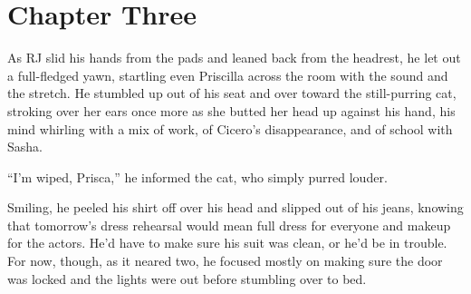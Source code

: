 \chapter{Chapter Three}

As RJ slid his hands from the pads and leaned back from the headrest, he let out a full-fledged yawn, startling even Priscilla across the room with the sound and the stretch.  He stumbled up out of his seat and over toward the still-purring cat, stroking over her ears once more as she butted her head up against his hand, his mind whirling with a mix of work, of Cicero's disappearance, and of school with Sasha.

``I'm wiped, Prisca,'' he informed the cat, who simply purred louder.

Smiling, he peeled his shirt off over his head and slipped out of his jeans, knowing that tomorrow's dress rehearsal would mean full dress for everyone and makeup for the actors.  He'd have to make sure his suit was clean, or he'd be in trouble.  For now, though, as it neared two, he focused mostly on making sure the door was locked and the lights were out before stumbling over to bed.

